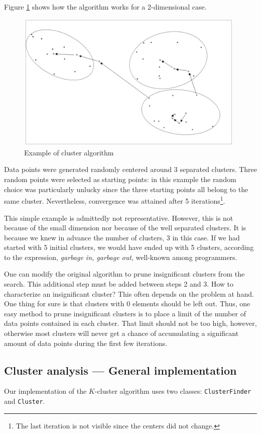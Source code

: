 \documentclass[twoside]{book}
\begin{document}
Figure \ref{fig:clustersteps} shows how the algorithm works for a
2-dimensional case.
\begin{figure}
\centering\includegraphics[width=11cm]{Figures/Clusters}
\caption{Example of cluster algorithm}\label{fig:clustersteps}
\end{figure}
Data points were generated randomly centered around 3 separated
clusters. Three random points were selected as starting points: in
this example the random choice was particularly unlucky since the
three starting points all belong to the same cluster.
Nevertheless, convergence was attained after 5
iterations\footnote{The last iteration is not visible since the
centers did not change.}.

 This simple example is admittedly not
representative. However, this is not because of the small
dimension nor because of the well separated clusters. It is
because we knew in advance the number of clusters, 3 in this case.
If we had started with 5 initial clusters, we would have ended up
with 5 clusters, according to the expression, {\sl garbage in,
garbage out}, well-known among programmers.

One can modify the original algorithm to prune insignificant
clusters from the search. This additional step must be added
between steps 2 and 3. How to characterize an insignificant
cluster? This often depends on the problem at hand. One thing for
sure is that clusters with 0 elements should be left out. Thus,
one easy method to prune insignificant clusters is to place a
limit of the number of data points contained in each cluster. That
limit should not be too high, however, otherwise most clusters
will never get a chance of accumulating a significant amount of
data points during the first few iterations.

\subsection{Cluster analysis --- General implementation}
 Our implementation of
the $K$-cluster algorithm uses two classes: {\tt ClusterFinder}
and {\tt Cluster}.
\end{document}
